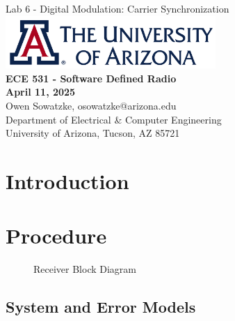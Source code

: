 \documentclass{article}
\begin{document}
\begin{titlepage}
	\centering
	{\huge Lab 6 - Digital Modulation: Carrier Synchronization}\\[0.25 in]
	\includegraphics[width=0.6\textwidth]{ua_logo.png}\\[0.25 in]
	{\large \textbf{ECE 531 - Software Defined Radio\\[0.25 in]
	April 11, 2025\\[0.25 in]}}
	{\large Owen Sowatzke, osowatzke@arizona.edu\\[0.05 in]
	Department of Electrical \& Computer Engineering\\[0.05 in]
	University of Arizona, Tucson, AZ 85721\\[0.5 in]}
	\hypersetup{linkcolor=navy-blue}
	\noindent\hrulefill
	\tableofcontents
	\noindent\hrulefill
\end{titlepage}


\section{Introduction}

\section{Procedure}

\begin{figure}[H]
	\centerline{}
	\caption{Receiver Block Diagram}
	\label{fig::receiver_block_diagram}
\end{figure}

\subsection{System and Error Models}
\end{document}
